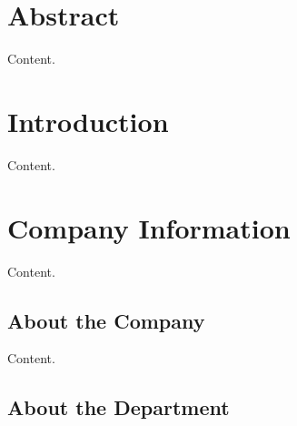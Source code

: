 \documentclass[10pt]{article}
\begin{document}
\tableofcontents

\newpage

\section{Abstract}

Content.

\newpage

\section{Introduction}


Content.

\section{Company Information}


Content.

\subsection{About the Company}

Content.

\subsection{About the Department}
\end{document}
